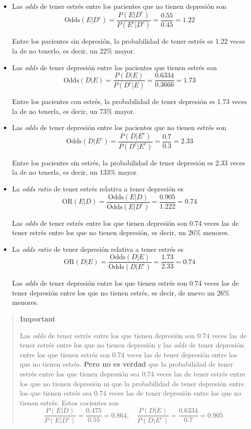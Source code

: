 \documentclass[
  spanish,
  letterpaper,
  DIV=11,
  numbers=noendperiod]{scrreprt}
\begin{document}
\begin{tcolorbox}
\begin{itemize}
\item
  Las \emph{odds} de tener estrés entre los pacientes que no tienen
  depresión son \[
  \text{Odds}(E|D^c)=\frac{P(E|D^c)}{P(E^c|D^c)}=\frac{0.55}{0.45}=1.22
  \]

  Entre los pacientes sin depresión, la probabilidad de tener estrés es
  1.22 veces la de no tenerlo, es decir, un 22\% mayor.
\item
  Las \emph{odds} de tener depresión entre los pacientes que tienen
  estrés son \[
  \text{Odds}(D|E)=\frac{P(D|E)}{P(D^c|E)}=\frac{0.6334}{0.3666}=1.73
  \]

  Entre los pacientes con estrés, la probabilidad de tener depresión es
  1.73 veces la de no tenerla, es decir, un 73\% mayor.
\item
  Las \emph{odds} de tener depresión entre los pacientes que no tienen
  estrés son \[
  \text{Odds}(D|E^c)=\frac{P(D|E^c)}{P(D^c|E^c)}=\frac{0.7}{0.3}=2.33
  \]

  Entre los pacientes sin estrés, la probabilidad de tener depresión es
  2.33 veces la de no tenerla, es decir, un 133\% mayor.
\item
  La \emph{odds ratio} de tener estrés relativa a tener depresión es \[
  \text{OR}(E|D)=\frac{\text{Odds}(E|D)}{\text{Odds}(E|D^c)}=\frac{0.905}{1.222}=0.74
  \]

  Las \emph{odds} de tener estrés entre los que tienen depresión son
  0.74 veces las de tener estrés entre los que no tienen depresión, es
  decir, un 26\% menores.
\item
  La \emph{odds ratio} de tener depresión relativa a tener estrés es \[
  \text{OR}(D|E)=\frac{\text{Odds}(D|E)}{\text{Odds}(D|E^c)}=\frac{1.73}{2.33}=0.74
  \]

  Las \emph{odds} de tener depresión entre los que tienen estrés son
  0.74 veces las de tener depresión entre los que no tienen estrés, es
  decir, de nuevo un 26\% menores.
\end{itemize}

\begin{quote}
\textbf{Important}

Las \emph{odds} de tener estrés entre los que tienen depresión son 0.74
veces las de tener estrés entre los que no tienen depresión y las
\emph{odds} de tener depresión entre los que tienen estrés son 0.74
veces las de tener depresión entre los que no tienen estrés.
\textbf{Pero no es verdad} que la probabilidad de tener estrés entre los
que tienen depresión sea 0.74 veces las de tener estrés entre los que no
tienen depresión ni que la probabilidad de tener depresión entre los que
tienen estrés sea 0.74 veces las de tener depresión entre los que no
tienen estrés. Estos cocientes son \[
\frac{P(E|D)}{P(E|D^c)}=\frac{0.475}{0.55}=0.864,\quad \frac{P(D|E)}{P(D|E^c)}=\frac{0.6334}{0.7}=0.905
\]
\end{quote}


\end{tcolorbox}
\end{document}

